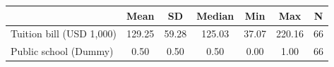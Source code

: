 {
\def\sym#1{\ifmmode^{#1}\else\(^{#1}\)\fi}
\begin{tabular}{l*{1}{cccccc}}
\hline\hline
                    &        Mean&          SD&      Median&         Min&         Max&           N\\
\hline
Tuition bill (USD 1,000)&      129.25&       59.28&      125.03&       37.07&      220.16&          66\\
Public school (Dummy)&        0.50&        0.50&        0.50&        0.00&        1.00&          66\\
\hline\hline
\end{tabular}
}
